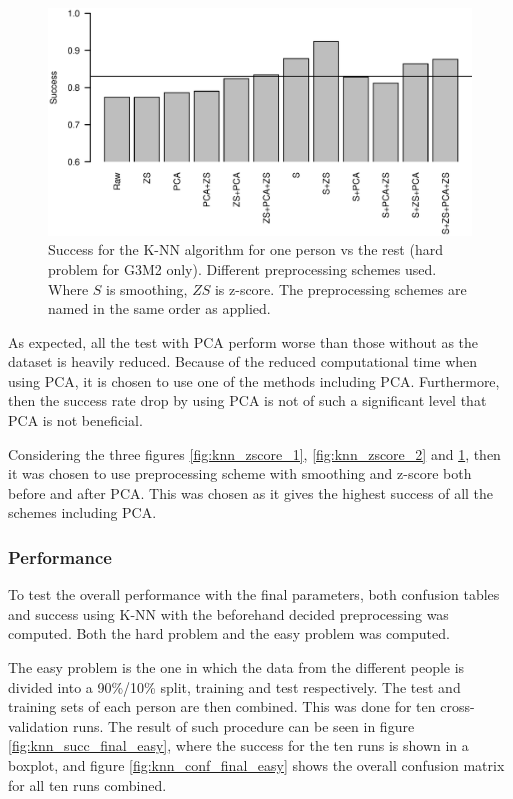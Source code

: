 \begin{figure}[H]
\includegraphics[width = 0.95 \textwidth]{graphics/knn_zscore_3}
\caption{Success for the K-NN algorithm for one person vs the rest (hard problem for G3M2 only). Different preprocessing schemes used.
Where $S$ is smoothing, $ZS$ is z-score.
The preprocessing schemes are named in the same order as applied.}
\label{fig:knn_zscore_3}
\end{figure}


As expected, all the test with PCA perform worse than those without as the dataset is heavily reduced.
Because of the reduced computational time when using PCA, it is chosen to use one of the methods including PCA.
Furthermore, then the success rate drop by using PCA is not of such a significant level that PCA is not beneficial.

Considering the three figures \ref{fig:knn_zscore_1}, \ref{fig:knn_zscore_2} and \ref{fig:knn_zscore_3}, then it was chosen to use preprocessing scheme with smoothing and z-score both before and after PCA.
This was chosen as it gives the highest success of all the schemes including PCA.

\subsubsection{Performance}

To test the overall performance with the final parameters, both confusion tables and success using K-NN with the beforehand decided preprocessing was computed.
Both the hard problem and the easy problem was computed.

The easy problem is the one in which the data from the different people is divided into a 90\%/10\% split, training and test respectively.
The test and training sets of each person are then combined.
This was done for ten cross-validation runs.
The result of such procedure can be seen in figure \ref{fig:knn_succ_final_easy}, where the success for the ten runs is shown in a boxplot, and figure \ref{fig:knn_conf_final_easy} shows the overall confusion matrix for all ten runs combined.


